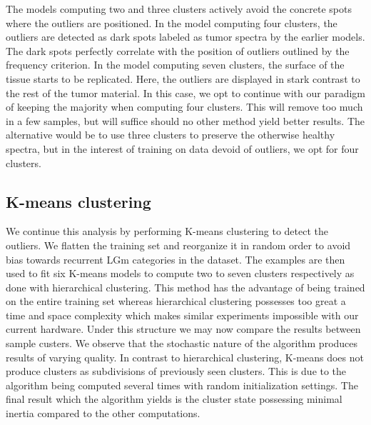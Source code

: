 The models computing two and three clusters actively avoid the concrete spots where the outliers are positioned. In the model computing four clusters, the outliers are detected as dark spots labeled as tumor spectra by the earlier models. The dark spots perfectly correlate with the position of outliers outlined by the frequency criterion. In the model computing seven clusters, the surface of the tissue starts to be replicated. Here, the outliers are displayed in stark contrast to the rest of the tumor material. In this case, we opt to continue with our paradigm of keeping the majority when computing four clusters. This will remove too much in a few samples, but will suffice should no other method yield better results. The alternative would be to use three clusters to preserve the otherwise healthy spectra, but in the interest of training on data devoid of outliers, we opt for four clusters.

\subsection{K-means clustering}

We continue this analysis by performing K-means clustering to detect the outliers. We flatten the training set and reorganize it in random order to avoid bias towards recurrent LGm categories in the dataset. The examples are then used to fit six K-means models to compute two to seven clusters respectively as done with hierarchical clustering. This method has the advantage of being trained on the entire training set whereas hierarchical clustering possesses too great a time and space complexity which makes similar experiments impossible with our current hardware. Under this structure we may now compare the results between sample custers. We observe that the stochastic nature of the algorithm produces results of varying quality. In contrast to hierarchical clustering, K-means does not produce clusters as subdivisions of previously seen clusters. This is due to the algorithm being computed several times with random initialization settings. The final result which the algorithm yields is the cluster state possessing minimal inertia compared to the other computations.

